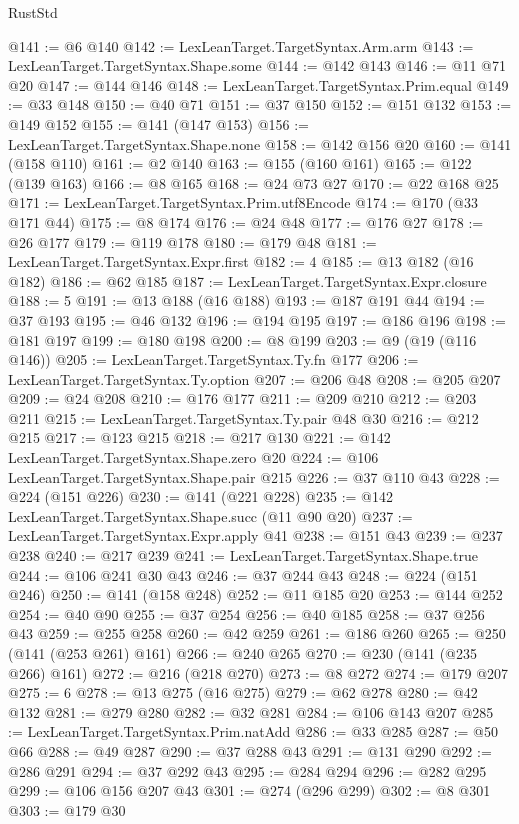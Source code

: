 \begin{lexlean}{RustStd}
\begin{coremodule}
{\begin{coremodule}
{{{{{{{{{{{{@141 := @6 @140
@142 := LexLeanTarget.TargetSyntax.Arm.arm
@143 := LexLeanTarget.TargetSyntax.Shape.some
@144 := @142 @143
@146 := @11 @71 @20
@147 := @144 @146
@148 := LexLeanTarget.TargetSyntax.Prim.equal
@149 := @33 @148
@150 := @40 @71
@151 := @37 @150
@152 := @151 @132
@153 := @149 @152
@155 := @141 (@147 @153)
@156 := LexLeanTarget.TargetSyntax.Shape.none
@158 := @142 @156 @20
@160 := @141 (@158 @110)
@161 := @2 @140
@163 := @155 (@160 @161)
@165 := @122 (@139 @163)
@166 := @8 @165
@168 := @24 @73 @27
@170 := @22 @168 @25
@171 := LexLeanTarget.TargetSyntax.Prim.utf8Encode
@174 := @170 (@33 @171 @44)
@175 := @8 @174
@176 := @24 @48
@177 := @176 @27
@178 := @26 @177
@179 := @119 @178
@180 := @179 @48
@181 := LexLeanTarget.TargetSyntax.Expr.first
@182 := 4
@185 := @13 @182 (@16 @182)
@186 := @62 @185
@187 := LexLeanTarget.TargetSyntax.Expr.closure
@188 := 5
@191 := @13 @188 (@16 @188)
@193 := @187 @191 @44
@194 := @37 @193
@195 := @46 @132
@196 := @194 @195
@197 := @186 @196
@198 := @181 @197
@199 := @180 @198
@200 := @8 @199
@203 := @9 (@19 (@116 @146))
@205 := LexLeanTarget.TargetSyntax.Ty.fn @177
@206 := LexLeanTarget.TargetSyntax.Ty.option
@207 := @206 @48
@208 := @205 @207
@209 := @24 @208
@210 := @176 @177
@211 := @209 @210
@212 := @203 @211
@215 := LexLeanTarget.TargetSyntax.Ty.pair @48 @30
@216 := @212 @215
@217 := @123 @215
@218 := @217 @130
@221 := @142 LexLeanTarget.TargetSyntax.Shape.zero @20
@224 := @106 LexLeanTarget.TargetSyntax.Shape.pair @215
@226 := @37 @110 @43
@228 := @224 (@151 @226)
@230 := @141 (@221 @228)
@235 := @142 LexLeanTarget.TargetSyntax.Shape.succ (@11 @90 @20)
@237 := LexLeanTarget.TargetSyntax.Expr.apply @41
@238 := @151 @43
@239 := @237 @238
@240 := @217 @239
@241 := LexLeanTarget.TargetSyntax.Shape.true
@244 := @106 @241 @30 @43
@246 := @37 @244 @43
@248 := @224 (@151 @246)
@250 := @141 (@158 @248)
@252 := @11 @185 @20
@253 := @144 @252
@254 := @40 @90
@255 := @37 @254
@256 := @40 @185
@258 := @37 @256 @43
@259 := @255 @258
@260 := @42 @259
@261 := @186 @260
@265 := @250 (@141 (@253 @261) @161)
@266 := @240 @265
@270 := @230 (@141 (@235 @266) @161)
@272 := @216 (@218 @270)
@273 := @8 @272
@274 := @179 @207
@275 := 6
@278 := @13 @275 (@16 @275)
@279 := @62 @278
@280 := @42 @132
@281 := @279 @280
@282 := @32 @281
@284 := @106 @143 @207
@285 := LexLeanTarget.TargetSyntax.Prim.natAdd
@286 := @33 @285
@287 := @50 @66
@288 := @49 @287
@290 := @37 @288 @43
@291 := @131 @290
@292 := @286 @291
@294 := @37 @292 @43
@295 := @284 @294
@296 := @282 @295
@299 := @106 @156 @207 @43
@301 := @274 (@296 @299)
@302 := @8 @301
@303 := @179 @30
}}}}}}}}}}}}
\end{coremodule}}
\end{coremodule}
\end{lexlean}
